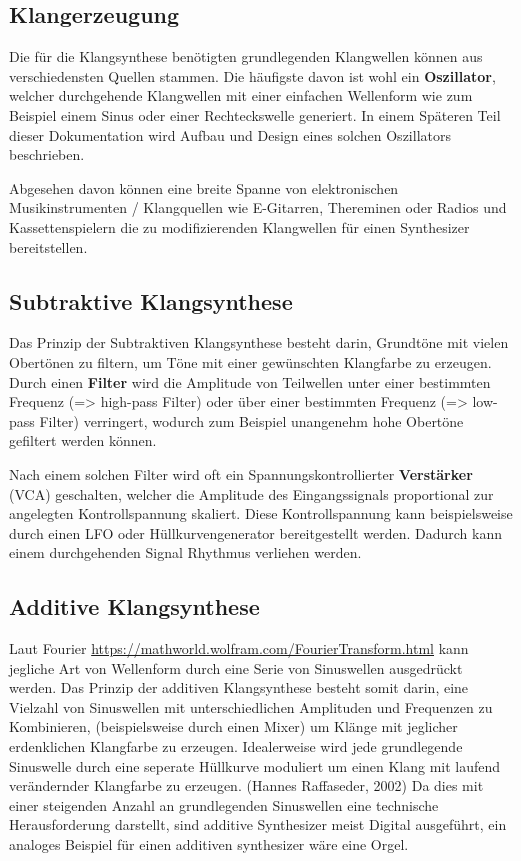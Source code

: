 \subsection{Klangerzeugung}
\label{sec:orgb41c38f}
Die für die Klangsynthese benötigten grundlegenden Klangwellen können aus verschiedensten Quellen stammen. Die häufigste davon ist wohl ein \textbf{Oszillator}, welcher durchgehende Klangwellen mit einer einfachen Wellenform wie zum Beispiel einem Sinus oder einer Rechteckswelle generiert. In einem Späteren Teil dieser Dokumentation wird Aufbau und Design eines solchen Oszillators beschrieben.

Abgesehen davon können eine breite Spanne von elektronischen Musikinstrumenten / Klangquellen wie E-Gitarren, Thereminen oder Radios und Kassettenspielern die zu modifizierenden Klangwellen für einen Synthesizer bereitstellen.

\subsection{Subtraktive Klangsynthese}
\label{sec:orga52496b}
Das Prinzip der Subtraktiven Klangsynthese besteht darin, Grundtöne mit vielen Obertönen zu filtern, um Töne mit einer gewünschten Klangfarbe zu erzeugen. Durch einen \textbf{Filter} wird die Amplitude von Teilwellen unter einer bestimmten Frequenz (=> high-pass Filter) oder über einer bestimmten Frequenz (=> low-pass Filter) verringert, wodurch zum Beispiel unangenehm hohe Obertöne gefiltert werden können.

Nach einem solchen Filter wird oft ein Spannungskontrollierter \textbf{Verstärker} (VCA) geschalten, welcher die Amplitude des Eingangssignals proportional zur angelegten Kontrollspannung skaliert. Diese Kontrollspannung kann beispielsweise durch einen LFO oder Hüllkurvengenerator bereitgestellt werden. Dadurch kann einem durchgehenden Signal Rhythmus verliehen werden.

\subsection{Additive Klangsynthese}
\label{sec:orgd7efe92}
Laut Fourier \url{https://mathworld.wolfram.com/FourierTransform.html} kann jegliche Art von Wellenform durch eine Serie von Sinuswellen ausgedrückt werden. Das Prinzip der additiven Klangsynthese besteht somit darin, eine Vielzahl von Sinuswellen mit unterschiedlichen Amplituden und Frequenzen zu Kombinieren, (beispielsweise durch einen Mixer) um Klänge mit jeglicher erdenklichen Klangfarbe zu erzeugen. Idealerweise wird jede grundlegende Sinuswelle durch eine seperate Hüllkurve moduliert um einen Klang mit laufend verändernder Klangfarbe zu erzeugen. (Hannes Raffaseder, 2002) Da dies mit einer steigenden Anzahl an grundlegenden Sinuswellen eine technische Herausforderung darstellt, sind additive Synthesizer meist Digital ausgeführt, ein analoges Beispiel für einen additiven synthesizer wäre eine Orgel.

